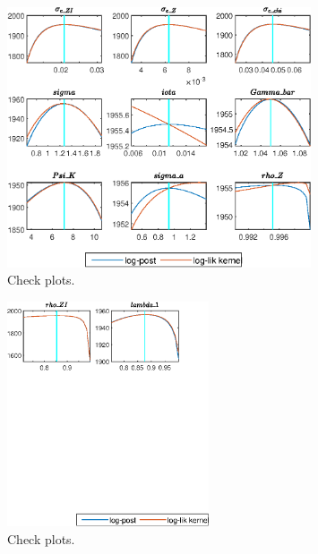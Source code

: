  
\begin{figure}[H]
\centering 
\includegraphics[width=0.80\textwidth]{two_sector_RBC_fixed_cost/graphs/two_sector_RBC_fixed_cost_CheckPlots1}
\caption{Check plots.}\label{Fig:CheckPlots:1}
\end{figure}
 
\begin{figure}[H]
\centering 
\includegraphics[width=0.53\textwidth]{two_sector_RBC_fixed_cost/graphs/two_sector_RBC_fixed_cost_CheckPlots2}
\caption{Check plots.}\label{Fig:CheckPlots:2}
\end{figure}
 
